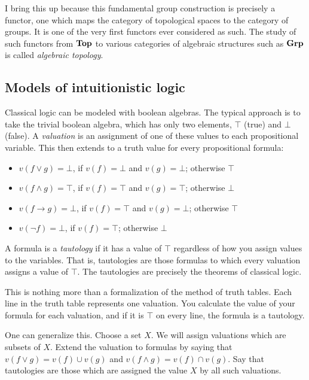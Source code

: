 \documentclass{article}
\def\cat#1{{\bf #1}}
\def\imp{\rightarrow}           %
\begin{document}

I bring this up because this fundamental group construction is
precisely a functor, one which maps the category of topological spaces
to the category of groups. It is one of the very first functors ever
considered as such.  The study of such functors from $\cat{Top}$ to
various categories of algebraic structures such as $\cat{Grp}$ is
called {\em algebraic topology\/}.

\subsection*{Models of intuitionistic logic}

Classical logic can be modeled with boolean algebras.  The typical
approach is to take the trivial boolean algebra, which has only two
elements, $\top$ (true) and $\bot$ (false).  A {\em valuation\/} is an
assignment of one of these values to each propositional variable.
This then extends to a truth value for every propositional formula: 

\begin{itemize}
\item $v(f\vee g) = \bot$, if $v(f) = \bot$ and $v(g) = \bot$;
  otherwise $\top$
\item $v(f\wedge g) = \top$, if $v(f) = \top$ and $v(g) = \top$;
  otherwise $\bot$
\item $v(f\imp g) = \bot$, if $v(f) = \top$ and $v(g) = \bot$;
  otherwise $\top$
\item $v(\neg f) = \bot$, if $v(f) = \top$; otherwise $\bot$
\end{itemize}

A formula is a {\em tautology\/} if it has a value of $\top$
regardless of how you assign values to the variables.  That is,
tautologies are those formulas to which every valuation assigns a
value of $\top$.  The tautologies are precisely the theorems of
classical logic.

This is nothing more than a formalization of the method of truth
tables.  Each line in the truth table represents one valuation.  You
calculate the value of your formula for each valuation, and if it is
$\top$ on every line, the formula is a tautology.

One can generalize this.  Choose a set $X$.  We will assign valuations
which are subsets of $X$.  Extend the valuation to formulas by saying
that $v(f\vee g) = v(f)\cup v(g)$ and $v(f\wedge g) = v(f)\cap v(g)$.
Say that tautologies are those which are assigned the value $X$ by all
such valuations.
\end{document}
